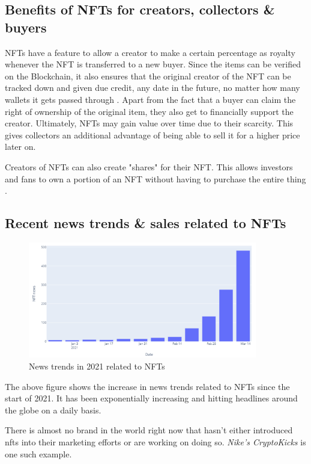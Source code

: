 \subsection{Benefits of NFTs for creators, collectors \& buyers}

NFTs have a feature to allow a creator to make a certain percentage as royalty whenever the NFT is transferred to a new buyer. Since the items can be verified on the Blockchain, it also ensures that the original creator of the NFT can be tracked down and given due credit, any date in the future, no matter how many wallets it gets passed through \autocite{chevet_blockchain_2018}. Apart from the fact that a buyer can claim the right of ownership of the original item, they also get to financially support the creator. Ultimately, NFTs may gain value over time due to their scarcity. This gives collectors an additional advantage of being able to sell it for a higher price later on.

Creators of NFTs can also create "shares" for their NFT. This allows investors and fans to own a portion of an NFT without having to purchase the entire thing \autocite{noauthor_erc-721_nodate}.


\subsection{Recent news trends \& sales related to NFTs}

\begin{figure}[h!]
\centering
\includegraphics[width=10cm]{images/LR/NFT-news-trends.png}
\caption{News trends in 2021 related to NFTs \autocite{dowling_fertile_2021}}
\end{figure}

The above figure shows the increase in news trends related to NFTs since the start of 2021. It has been exponentially increasing and hitting headlines around the globe on a daily basis.

There is almost no brand in the world right now that hasn't either introduced \gls{nft}s into their marketing efforts or are working on doing so. \textit{Nike's CryptoKicks} \autocite{beedham_nike_2019} is one such example.


